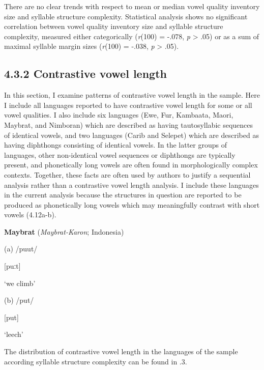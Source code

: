   There are no clear trends with respect to mean or median vowel quality inventory size and syllable structure complexity. Statistical analysis shows no significant correlation between vowel quality inventory size and syllable structure complexity, measured either categorically (\textit{r}(100) = -.078, \textit{p} > .05) or as a sum of maximal syllable margin sizes (\textit{r}(100) = -.038, \textit{p} > .05).

\subsection{4.3.2 Contrastive vowel length}

  In this section, I examine patterns of contrastive vowel length in the sample. Here I include all languages reported to have contrastive vowel length for some or all vowel qualities. I also include six languages (Ewe, Fur, Kambaata, Maori, Maybrat, and Nimboran) which are described as having tautosyllabic sequences of identical vowels, and two languages (Carib and Selepet) which are described as having diphthongs consisting of identical vowels. In the latter groups of languages, other non-identical vowel sequences or diphthongs are typically present, and phonetically long vowels are often found in morphologically complex contexts. Together, these facts are often used by authors to justify a sequential analysis rather than a contrastive vowel length analysis. I include these languages in the current analysis because the structures in question are reported to be produced as phonetically long vowels which may meaningfully contrast with short vowels (4.12a-b).

\ea\label{ex:(4.12)}
   \textbf{Maybrat} (\textit{Maybrat-Karon}; Indonesia)

(a)  /puut/

  [puːt]

  ‘we climb’

(b)  /put/

  [put]

  ‘leech’

\citep[29]{Dol2007}

\z

  The distribution of contrastive vowel length in the languages of the sample according syllable structure complexity can be found in .3.

